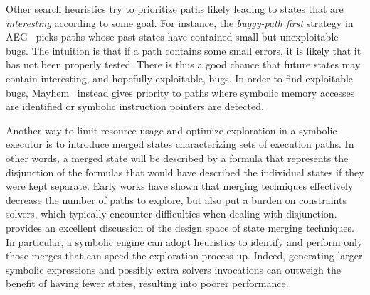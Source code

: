 
Other search heuristics try to prioritize paths likely leading to states that are {\em interesting} according to some goal. For instance, the {\em buggy-path first} strategy in {\sc AEG}~\cite{AEG-NDSS11} picks paths whose past states have contained small but unexploitable bugs. The intuition is that if a path contains some small errors, it is likely that it has not been properly tested. There is thus a good chance that future states may contain interesting, and hopefully exploitable, bugs.
In order to find exploitable bugs, {\sc Mayhem}~\cite{MAYHEM-SP12} instead gives priority to paths where symbolic memory accesses are identified or symbolic instruction pointers are detected.


Another way to limit resource usage and optimize exploration in a symbolic executor is to introduce merged states characterizing sets of execution paths. In other words, a merged state will be described by a formula that represents the disjunction of the formulas that would have described the individual states if they were kept separate. 
Early works have shown that merging techniques effectively decrease the number of paths to explore, but also put a burden on constraints solvers, which typically encounter difficulties when dealing with disjunction. \cite{KKB-PLDI12} provides an excellent discussion of the design space of state merging techniques. In particular, a symbolic engine can adopt heuristics to identify and perform only those merges that can speed the exploration process up. Indeed, generating larger symbolic expressions and possibly extra solvers invocations can outweigh the benefit of having fewer states, resulting into poorer performance.%